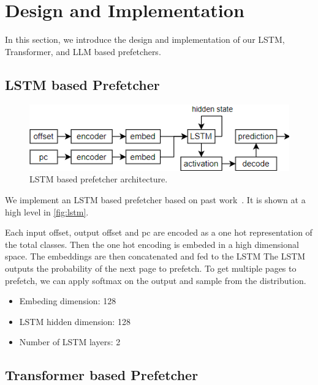 \section{Design and Implementation}\label{sec:4}

In this section, we introduce the design and implementation of our LSTM, Transformer, and LLM based prefetchers. 


\subsection{LSTM based Prefetcher}\label{sec:4.1}

\begin{figure}[]
\centering
\includegraphics[width=\columnwidth]{images/LSTM.png}
\caption{LSTM based prefetcher architecture.}
\label{fig:lstm}
\end{figure}

We implement an LSTM based prefetcher based on past work~\cite{LMAP}. It is shown at a high level in \autoref{fig:lstm}.

Each input offset, output offset and pc are encoded as a one hot representation of the total classes. Then the one hot encoding is embeded in a high dimensional space. The embeddings are then concatenated and fed to the LSTM The LSTM outputs the probability of the next page to prefetch. To get multiple pages to prefetch, we can apply softmax on the output and sample from the distribution. 

\begin{itemize}
    \item Embeding dimension: 128
    \item LSTM hidden dimension: 128
    \item Number of LSTM layers: 2
\end{itemize}



\subsection{Transformer based Prefetcher}\label{sec:4.2}

